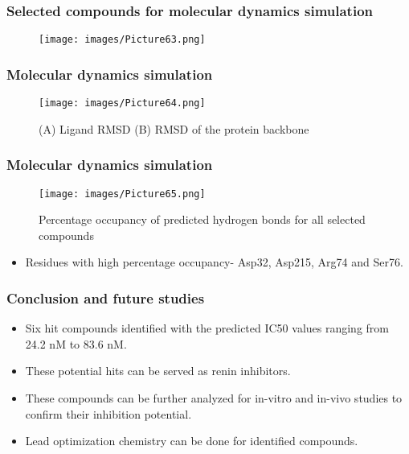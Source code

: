 \documentclass{beamer}
\begin{document}
\begin{frame}
\frametitle{\textbf{Selected compounds for molecular dynamics simulation}}
\begin{figure}
\texttt{[image: images/Picture63.png]}
\end{figure}
\end{frame}

\begin{frame}
\frametitle{\textbf{Molecular dynamics simulation}}
\begin{figure}
\texttt{[image: images/Picture64.png]}
\caption{(A) Ligand RMSD (B) RMSD of the protein backbone}
\end{figure}
\end{frame}

\begin{frame}
\frametitle{\textbf{Molecular dynamics simulation}}
\begin{figure}
\texttt{[image: images/Picture65.png]}
\caption{Percentage occupancy of predicted hydrogen bonds for all selected compounds}
\end{figure}
\begin{itemize}
\item Residues with high percentage occupancy- Asp32, Asp215, Arg74 and Ser76.
\end{itemize}
\end{frame}

\begin{frame}
\frametitle{\textbf{Conclusion and future studies}}
\begin{itemize}
\item Six hit compounds identified with the predicted IC50 values ranging from 24.2 nM to 83.6 nM.
\item These potential hits can be served as renin inhibitors.
\item These compounds can be further analyzed for in-vitro and in-vivo studies to confirm their inhibition potential.
\item Lead optimization chemistry can be done for identified compounds.
\end{itemize}
\end{frame}
\end{document}
